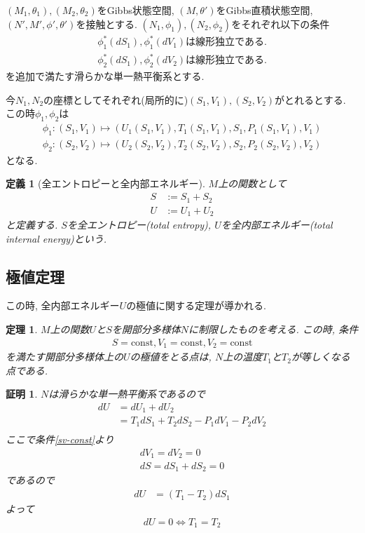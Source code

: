 \documentclass[a4paper,12pt]{ltjsarticle}
\theoremstyle{break}
\newtheorem{defn}[thm]{定義}
\newtheorem{thrm}[thm]{定理}
\newtheorem*{prf}{証明}
\newcommand{\mt}{\mapsto}
\newcommand{\const}{\mathrm{const}}
\numberwithin{equation}{section}
\begin{document}
$(M_1,\theta_1),(M_2,\theta_2)$をGibbs状態空間, $(M, \theta')$をGibbs直積状態空間, 
$(N',M',\phi',\theta')$を接触とする. 
$(N_1,\phi_1),(N_2,\phi_2)$をそれぞれ以下の条件
\begin{align*}
  \phi_1^*(dS_1),\phi_1^*(dV_1) \text{は線形独立である.} \\
  \phi_2^*(dS_1),\phi_2^*(dV_2) \text{は線形独立である.}
\end{align*}
を追加で満たす滑らかな単一熱平衡系とする. 

今$N_1,N_2$の座標としてそれぞれ(局所的に)$(S_1,V_1),(S_2,V_2)$がとれるとする. この時$\phi_1,\phi_2$は
\begin{align}
  \label{phi_1}
  \phi_1: (S_1,V_1) \mt (U_1(S_1,V_1), T_1(S_1,V_1), S_1, P_1(S_1,V_1), V_1) \\
  \label{phi_2}
  \phi_2: (S_2,V_2) \mt (U_2(S_2,V_2), T_2(S_2,V_2), S_2, P_2(S_2,V_2), V_2) 
\end{align}
となる. 

\begin{defn}[全エントロピーと全内部エネルギー]
  $M$上の関数として
\begin{align*}
  S &:= S_1 + S_2 \\
  U &:= U_1 + U_2
\end{align*}
と定義する. 
$S$を全エントロピー(total entropy), $U$を全内部エネルギー(total internal energy)という. 
\end{defn}

\subsection{極値定理}

この時, 全内部エネルギー$U$の極値に関する定理が導かれる. 

\begin{thrm}
  $M$上の関数$U$と$S$を開部分多様体$N$に制限したものを考える. 
  この時, 条件
  \begin{align}
    \label{sv-const}
    S = \const, V_1 = \const, V_2 = \const
  \end{align}
  を満たす開部分多様体上の$U$の極値をとる点は, $N$上の温度$T_1$と$T_2$が等しくなる点である. 
\end{thrm}

\begin{prf}
  $N$は滑らかな単一熱平衡系であるので %
  \begin{align*}
    dU 
    &= dU_1 + dU_2 \\
    &= T_1dS_1 + T_2dS_2 - P_1dV_1 - P_2dV_2 \\
  \end{align*} 
  ここで条件\eqref{sv-const}より
  \begin{align*}
    dV_1 =dV_2 = 0 \\
    dS = dS_1 + dS_2 = 0
  \end{align*}
  であるので
  \begin{align*}
    dU 
    &= (T_1 - T_2)dS_1
  \end{align*}
  よって
  \begin{align*}
    dU = 0 
    \Leftrightarrow T_1 = T_2
  \end{align*}
\end{prf}
\end{document}
